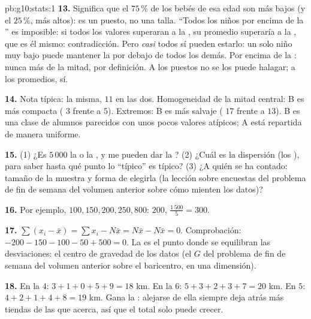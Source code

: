 \begin{solution}{pb:g10:stats:1}
\textbf{13.} Significa que el $75\,\%$ de los bebés de esa edad son más
bajos (y el $25\,\%$, más altos): es un puesto, no una talla. ``Todos los
niños por encima de la '' es imposible: si todos los valores
superaran a la , su promedio superaría a la , que es él mismo:
contradicción. Pero \emph{casi} todos sí pueden estarlo: un solo niño muy
bajo puede mantener la  por debajo de todos los demás. Por encima de
la \emph{}: nunca más de la mitad, por definición. A los puestos no
se los puede halagar; a los promedios, sí.

\textbf{14.} Nota típica: la misma,  $11$ en las dos.
Homogeneidad de la mitad central: B es más compacta ( $3$ frente a $5$). Extremos: B es más salvaje (
$17$ frente a $13$). B es una clase de alumnos parecidos con unos pocos
valores atípicos; A está repartida de manera uniforme.

\textbf{15.} (1) ¿Es $5\,000$ la  o la , y me pueden dar la
? (2) ¿Cuál es la dispersión (los ), para saber hasta qué
punto lo ``típico'' es típico? (3) ¿A quién se ha contado: tamaño de la
muestra y forma de elegirla (la lección sobre encuestas del problema de
fin de semana del volumen anterior sobre cómo mienten los datos)?

\textbf{16.} Por ejemplo, $100, 150, 200, 250, 800$:  $200$, 
$\frac{1\,500}{5} = 300$.

\textbf{17.} $\sum (x_i - \bar x) = \sum x_i - N \bar x = N\bar x -
N\bar x = 0$. Comprobación: $-200 - 150 - 100 - 50 + 500 = 0$. La  es
el punto donde se equilibran las desviaciones: el centro de gravedad de
los datos (el $G$ del problema de fin de semana del volumen anterior sobre
el baricentro, en una dimensión).

\textbf{18.} En la  $4$: $3 + 1 + 0 + 5 + 9 = 18$ km. En la 
$6$: $5 + 3 + 2 + 3 + 7 = 20$ km. En $5$: $4 + 2 + 1 + 4 + 8 = 19$ km.
Gana la : alejarse de ella siempre deja atrás más tiendas de las
que acerca, así que el total solo puede crecer.


\end{solution}
